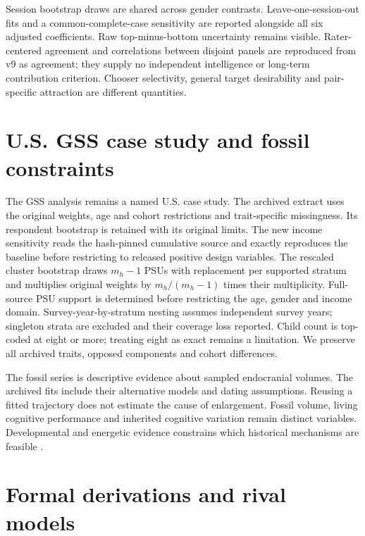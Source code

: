 Session bootstrap draws are shared across gender contrasts. Leave-one-session-out fits and a common-complete-case sensitivity are reported alongside all six adjusted coefficients. Raw top-minus-bottom uncertainty remains visible. Rater-centered agreement and correlations between disjoint panels are reproduced from v9 as agreement; they supply no independent intelligence or long-term contribution criterion. Chooser selectivity, general target desirability and pair-specific attraction are different quantities.




\section{U.S. GSS case study and fossil constraints}

The GSS analysis remains a named U.S. case study. The archived extract uses the original weights, age and cohort restrictions and trait-specific missingness. Its respondent bootstrap is retained with its original limits. The new income sensitivity reads the hash-pinned cumulative source and exactly reproduces the baseline before restricting to released positive design variables. The rescaled cluster bootstrap draws $m_h-1$ PSUs with replacement per supported stratum and multiplies original weights by $m_h/(m_h-1)$ times their multiplicity. Full-source PSU support is determined before restricting the age, gender and income domain. Survey-year-by-stratum nesting assumes independent survey years; singleton strata are excluded and their coverage loss reported. Child count is top-coded at eight or more; treating eight as exact remains a limitation. We preserve all archived traits, opposed components and cohort differences.





The fossil series is descriptive evidence about sampled endocranial volumes. The archived fits include their alternative models and dating assumptions. Reusing a fitted trajectory does not estimate the cause of enlargement. Fossil volume, living cognitive performance and inherited cognitive variation remain distinct variables. Developmental and energetic evidence constrains which historical mechanisms are feasible \citep{du2018,will2021,gingerich2022,kuzawa2014}.



\section{Formal derivations and rival models}

